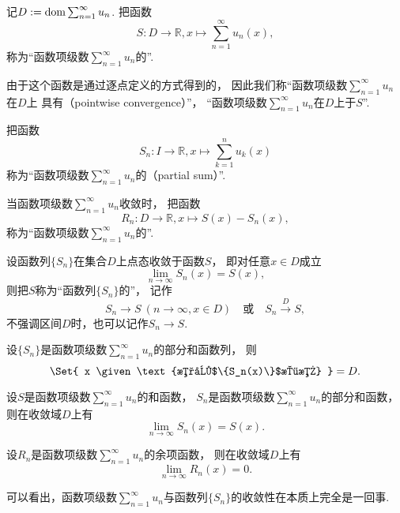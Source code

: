 \begin{definition}
记\(D := \operatorname{dom}\sum_{n=1}^\infty u_n\).
把函数\[
	S\colon D\to\mathbb{R},
	x \mapsto \sum_{n=1}^\infty u_n(x),
\]称为“函数项级数\(\sum_{n=1}^\infty u_n\)的”.

由于这个函数是通过逐点定义的方式得到的，
因此我们称“函数项级数\(\sum_{n=1}^\infty u_n\)在\(D\)上
具有（pointwise convergence）”，
“函数项级数\(\sum_{n=1}^\infty u_n\)在\(D\)上于\(S\)”.

把函数\[
	S_n\colon I\to\mathbb{R},
	x \mapsto \sum_{k=1}^n u_k(x)
\]称为“函数项级数\(\sum_{n=1}^\infty u_n\)的（partial sum）”.
\end{definition}

\begin{definition}
当函数项级数\(\sum_{n=1}^\infty u_n\)收敛时，
把函数\[
	R_n\colon D\to\mathbb{R},
	x \mapsto S(x) - S_n(x),
\]称为“函数项级数\(\sum_{n=1}^\infty u_n\)的”.
\end{definition}

\begin{definition}
设函数列\(\{S_n\}\)在集合\(D\)上点态收敛于函数\(S\)，
即对任意\(x \in D\)成立\[
	\lim_{n\to\infty} S_n(x) = S(x),
\]
则把\(S\)称为“函数列\(\{S_n\}\)的”，
记作\[
	S_n \to S\ (n\to\infty,x \in D)
	\quad\text{或}\quad
	S_n \overset{D}\to S,
\]
不强调区间\(D\)时，也可以记作\(S_n \to S\).
\end{definition}

\begin{proposition}
设\(\{S_n\}\)是函数项级数\(\sum_{n=1}^\infty u_n\)的部分和函数列，
则\[
	\Set{ x \given \text{数列$\{S_n(x)\}$收敛} } = D.
\]
\end{proposition}
\begin{proposition}
设\(S\)是函数项级数\(\sum_{n=1}^\infty u_n\)的和函数，
\(S_n\)是函数项级数\(\sum_{n=1}^\infty u_n\)的部分和函数，
则在收敛域\(D\)上有\[
	\lim_{n\to\infty} S_n(x) = S(x).
\]
\end{proposition}
\begin{proposition}
设\(R_n\)是函数项级数\(\sum_{n=1}^\infty u_n\)的余项函数，
则在收敛域\(D\)上有\[
	\lim_{n\to\infty} R_n(x) = 0.
\]
\end{proposition}
\begin{remark}
可以看出，函数项级数\(\sum_{n=1}^\infty u_n\)与函数列\(\{S_n\}\)的收敛性在本质上完全是一回事.
\end{remark}

